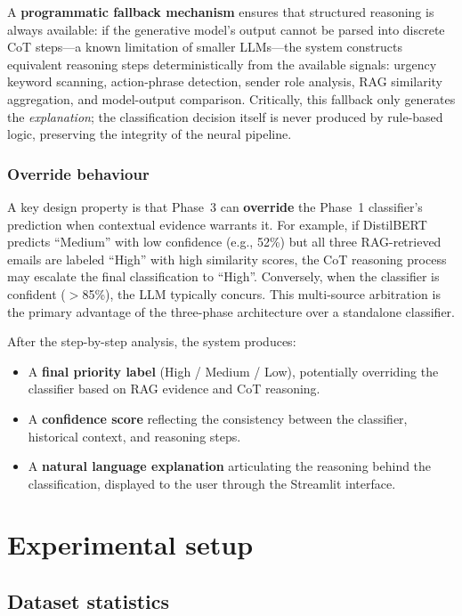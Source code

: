 \documentclass[3p,times,procedia]{elsarticle}
\begin{document}
A \textbf{programmatic fallback mechanism} ensures that structured reasoning is always available: if the generative model's output cannot be parsed into discrete CoT steps---a known limitation of smaller LLMs---the system constructs equivalent reasoning steps deterministically from the available signals: urgency keyword scanning, action-phrase detection, sender role analysis, RAG similarity aggregation, and model-output comparison. Critically, this fallback only generates the \textit{explanation}; the classification decision itself is never produced by rule-based logic, preserving the integrity of the neural pipeline.

\subsubsection{Override behaviour}

A key design property is that Phase~3 can \textbf{override} the Phase~1 classifier's prediction when contextual evidence warrants it. For example, if DistilBERT predicts ``Medium'' with low confidence (e.g., 52\%) but all three RAG-retrieved emails are labeled ``High'' with high similarity scores, the CoT reasoning process may escalate the final classification to ``High''. Conversely, when the classifier is confident ($>$85\%), the LLM typically concurs. This multi-source arbitration is the primary advantage of the three-phase architecture over a standalone classifier.

After the step-by-step analysis, the system produces:

\begin{itemize}
\item A \textbf{final priority label} (High / Medium / Low), potentially overriding the classifier based on RAG evidence and CoT reasoning.
\item A \textbf{confidence score} reflecting the consistency between the classifier, historical context, and reasoning steps.
\item A \textbf{natural language explanation} articulating the reasoning behind the classification, displayed to the user through the Streamlit interface.
\end{itemize}


\section{Experimental setup}
\label{sec:experiments}

\subsection{Dataset statistics}
\end{document}
